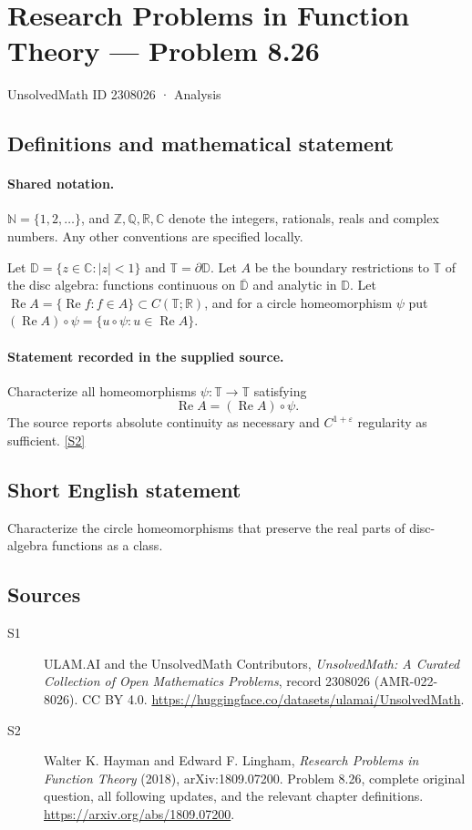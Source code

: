 \documentclass[11pt]{book}
\newcommand{\sref}[2]{\hyperlink{source:#1:#2}{[S#2]}}
\begin{document}
\setcounter{section}{2308025}
\section{Research Problems in Function Theory — Problem 8.26}\label{2308026}
{\small\sffamily UnsolvedMath ID 2308026 · Analysis}
\subsection{Definitions and mathematical statement}

\paragraph{Shared notation.}$\mathbb N=\{1,2,\ldots\}$, and $\mathbb Z,\mathbb Q,\mathbb R,\mathbb C$ denote the integers, rationals, reals and complex numbers. Any other conventions are specified locally.


Let $\mathbb D=\{z\in\mathbb C:|z|<1\}$ and $\mathbb T=\partial\mathbb D$. Let $A$ be the boundary restrictions to $\mathbb T$ of the disc algebra: functions continuous on $\overline{\mathbb D}$ and analytic in $\mathbb D$. Let $\operatorname{Re}A=\{\operatorname{Re}f:f\in A\}\subset C(\mathbb T;\mathbb R)$, and for a circle homeomorphism $\psi$ put $(\operatorname{Re}A)\circ\psi=\{u\circ\psi:u\in\operatorname{Re}A\}$.
\paragraph{Statement recorded in the supplied source.}
Characterize all homeomorphisms $\psi:\mathbb T\to\mathbb T$ satisfying \[\operatorname{Re}A=(\operatorname{Re}A)\circ\psi.\] The source reports absolute continuity as necessary and $C^{1+\varepsilon}$ regularity as sufficient. \sref{2308026}{2}
\subsection{Short English statement}
Characterize the circle homeomorphisms that preserve the real parts of disc-algebra functions as a class.
\subsection{Sources}
\begin{description}
\item[\hypertarget{source:2308026:1}{S1}] ULAM.AI and the UnsolvedMath Contributors, \emph{UnsolvedMath: A Curated Collection of Open Mathematics Problems}, record 2308026 (AMR-022-8026). CC BY 4.0. \url{https://huggingface.co/datasets/ulamai/UnsolvedMath}.
\item[\hypertarget{source:2308026:2}{S2}] Walter K. Hayman and Edward F. Lingham, \emph{Research Problems in Function Theory} (2018), arXiv:1809.07200. Problem 8.26, complete original question, all following updates, and the relevant chapter definitions. \url{https://arxiv.org/abs/1809.07200}.
\end{description}
\label{end:2308026}
\end{document}
